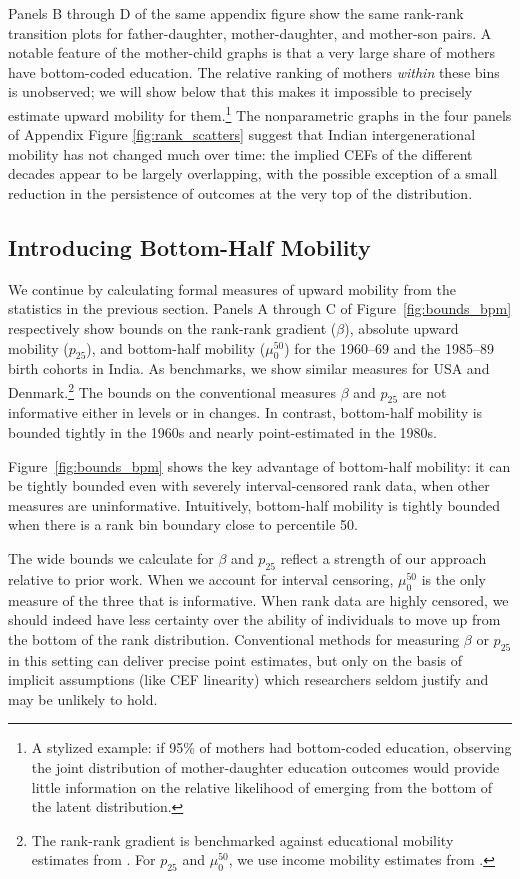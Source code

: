 \documentclass[12pt,letterpaper]{article}
\numberwithin{equation}{section}
\begin{document}
Panels B through D of the same appendix figure show the same rank-rank transition plots for father-daughter, mother-daughter, and mother-son pairs. A notable feature of the mother-child graphs is that a very large share of mothers have bottom-coded education. The relative ranking of mothers \textit{within} these bins is unobserved; we will show below that this makes it impossible to precisely estimate upward mobility for them.\footnote{A stylized example: if 95\% of mothers had bottom-coded education, observing the joint distribution of mother-daughter education outcomes would provide little information on the relative likelihood of emerging from the bottom of the latent distribution.} The nonparametric graphs in the four panels of Appendix Figure \ref{fig:rank_scatters} suggest that Indian intergenerational mobility has not changed much over time: the implied CEFs of the different decades appear to be largely overlapping, with the possible exception of a small reduction in the persistence of outcomes at the very top of the distribution.

\subsection{Introducing Bottom-Half Mobility}
\label{sec:comp_bounds} 

We continue by calculating formal measures of upward mobility from the statistics in the previous section. Panels A through C of Figure~\ref{fig:bounds_bpm} respectively show bounds on the rank-rank gradient ($\beta$), absolute upward mobility ($p_{25}$), and bottom-half mobility ($\mu_0^{50}$) for the 1960--69 and the 1985--89 birth cohorts in India. As benchmarks, we show similar measures for USA and Denmark.\footnote{The rank-rank gradient is benchmarked against educational mobility estimates from . For $p_{25}$ and $\mu_0^{50}$, we use income mobility estimates from .} The bounds on the conventional measures $\beta$ and $p_{25}$ are not informative either in levels or in changes. In contrast, bottom-half mobility is bounded tightly in the 1960s and nearly point-estimated in the 1980s.

Figure~\ref{fig:bounds_bpm} shows the key advantage of bottom-half mobility: it can be tightly bounded even with severely interval-censored rank data, when other measures are uninformative. Intuitively, bottom-half mobility is tightly bounded when there is a rank bin boundary close to percentile 50. 

The wide bounds we calculate for $\beta$ and $p_{25}$ reflect a strength of our approach relative to prior work. When we account for interval censoring, $\mu_0^{50}$ is the only measure of the three that is informative. When rank data are highly censored, we should indeed have less certainty over the ability of individuals to move up from the bottom of the rank distribution. Conventional methods for measuring $\beta$ or $p_{25}$ in this setting can deliver precise point estimates, but only on the basis of implicit assumptions (like CEF linearity) which researchers seldom justify and may be unlikely to hold.
\end{document}
